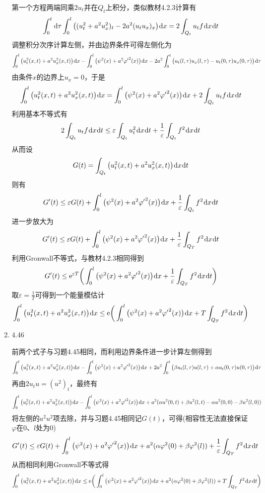 \documentclass[a4paper,UTF8,fontset=windows,10pt]{ctexart}
\newcommand*{\dr}{\hspace{0.07em}\mathrm{d}}
\newcommand*{\er}{\mathrm{e}}
\begin{document}
\begin{enumerate}
    第一个方程两端同乘$2u_t$并在$Q_t$上积分，类似教材4.2.3计算有
    $$\int_0^t\dr\tau\int_0^l\big((u_t^2+a^2u_x^2)_t-2a^2(u_tu_x)_x\big)\dr x=2\int_{Q_t}u_tf\dr x\dr t$$
    调整积分次序计算左侧，并由边界条件可得左侧化为
    $$\int_0^l\big(u_t^2(x,t)+a^2u_x^2(x,t)\big)\dr x-\int_0^l\big(\psi^2(x)+a^2{\varphi'}^2(x)\big)\dr x-2a^2\int_0^t\big(u_t(l,\tau)u_x(l,\tau)-u_t(0,\tau)u_x(0,\tau)\big)\dr\tau$$
    由条件$x$的边界上$u_x=0$，于是
    $$\int_0^l\big(u_t^2(x,t)+a^2u_x^2(x,t)\big)\dr x=\int_0^l\big(\psi^2(x)+a^2{\varphi'}^2(x)\big)\dr x+2\int_{Q_t}u_tf\dr x\dr t$$
    利用基本不等式有
    $$2\int_{Q_t}u_tf\dr x\dr t\le\varepsilon\int_{Q_t}u_t^2\dr x\dr t+\frac{1}{\varepsilon}\int_{Q_t}f^2\dr x\dr t$$
    从而设
    $$G(t)=\int_{Q_t}\big(u_t^2(x,t)+a^2u_x^2(x,t)\big)\dr x\dr t$$
    则有
    $$G'(t)\le\varepsilon G(t)+\int_0^l\big(\psi^2(x)+a^2{\varphi'}^2(x)\big)\dr x+\frac{1}{\varepsilon}\int_{Q_t}f^2\dr x\dr t$$
    进一步放大为
    $$G'(t)\le\varepsilon G(t)+\int_0^l\big(\psi^2(x)+a^2{\varphi'}^2(x)\big)\dr x+\frac{1}{\varepsilon}\int_{Q_T}f^2\dr x\dr t$$
    利用Gronwall不等式，与教材4.2.3相同得到
    $$G'(t)\le\er^{\varepsilon T}\bigg(\int_0^l\big(\psi^2(x)+a^2{\varphi'}^2(x)\big)\dr x+\frac{1}{\varepsilon}\int_{Q_T}f^2\dr x\dr t\bigg)$$
    取$\varepsilon=\frac{1}{T}$可得到一个能量模估计
    $$\int_0^l\big(u_t^2(x,t)+a^2u_x^2(x,t)\big)\dr x\le\er\bigg(\int_0^l\big(\psi^2(x)+a^2{\varphi'}^2(x)\big)\dr x+T\int_{Q_T}f^2\dr x\dr t\bigg)$$
    
    \item 4.46
    
    前两个式子与习题4.45相同，而利用边界条件进一步计算左侧得到
    $$\int_0^l\big(u_t^2(x,t)+a^2u_x^2(x,t)\big)\dr x-\int_0^l\big(\psi^2(x)+a^2{\varphi'}^2(x)\big)\dr x+2a^2\int_0^t\big(\beta u_t(l,\tau)u(l,\tau)+\alpha u_t(0,\tau)u(0,\tau)\big)\dr\tau$$
    再由$2u_tu=(u^2)_t$，最终有
    $$\int_0^l\big(u_t^2(x,t)+a^2u_x^2(x,t)\big)\dr x-\int_0^l\big(\psi^2(x)+a^2{\varphi'}^2(x)\big)\dr x+a^2(\alpha u^2(0,t)+\beta u^2(l,t)-\alpha u^2(0,0)-\beta u^2(l,0))$$
    将左侧的$a^2u^2$项去除，并与习题4.45相同记$G(t)$，可得(相容性无法直接保证$\varphi$在0、$l$处为0)
    $$G'(t)\le\varepsilon G(t)+\int_0^l\big(\psi^2(x)+a^2{\varphi'}^2(x)\big)\dr x+a^2(\alpha\varphi^2(0)+\beta\varphi^2(l))+\frac{1}{\varepsilon}\int_{Q_T}f^2\dr x\dr t$$
    从而相同利用Gronwall不等式得
    $$\int_0^l\big(u_t^2(x,t)+a^2u_x^2(x,t)\big)\dr x\le\er\bigg(\int_0^l\big(\psi^2(x)+a^2{\varphi'}^2(x)\big)\dr x+a^2(\alpha\varphi^2(0)+\beta\varphi^2(l))+T\int_{Q_T}f^2\dr x\dr t\bigg)$$
    

\end{enumerate}
\end{document}
